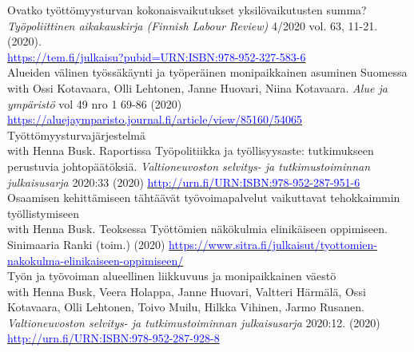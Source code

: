 \documentclass[16pt]{article}
\begin{document}
\noindent Ovatko ty\"{o}tt\"{o}myysturvan kokonaisvaikutukset yksil\"{o}vaikutusten summa? \\
\noindent  \textit{Ty\"{o}poliittinen aikakauskirja (Finnish Labour Review)} 4/2020 vol. 63, 11-21.  (2020). \\ \href{https://tem.fi/julkaisu?pubid=URN:ISBN:978-952-327-583-6} {\textcolor{blue}{https://tem.fi/julkaisu?pubid=URN:ISBN:978-952-327-583-6}}\\

\noindent Alueiden v\"{a}linen ty\"{o}ss\"{a}k\"{a}ynti ja ty\"{o}per\"{a}inen monipaikkainen asuminen Suomessa \\
\noindent with Ossi Kotavaara, Olli Lehtonen, Janne Huovari, Niina Kotavaara. \textit{Alue ja ympäristö} vol 49 nro 1 69-86 (2020) \href{https://aluejaymparisto.journal.fi/article/view/85160/54065}{\textcolor{blue}{https://aluejaymparisto.journal.fi/article/view/85160/54065}} \\
 
\noindent Ty\"{o}tt\"{o}myysturvaj\"{a}rjestelm\"{a} \\
\noindent with Henna Busk. Raportissa Ty\"{o}politiikka ja ty\"{o}llisyysaste: tutkimukseen perustuvia johtop\"{a}\"{a}t\"{o}ksi\"{a}. \textit{Valtioneuvoston selvitys- ja tutkimustoiminnan julkaisusarja} 2020:33 (2020) \href{http://urn.fi/URN:ISBN:978-952-287-951-6}{\textcolor{blue}{http://urn.fi/URN:ISBN:978-952-287-951-6}} \\

\noindent Osaamisen kehitt\"{a}miseen t\"{a}ht\"{a}\"{a}v\"{a}t ty\"{o}voimapalvelut vaikuttavat tehokkaimmin ty\"{o}llistymiseen \\
\noindent with Henna Busk. Teoksessa Työttömien näkökulmia elinikäiseen oppimiseen. Sinimaaria Ranki (toim.) (2020) \href{https://www.sitra.fi/julkaisut/tyottomien-nakokulma-elinikaiseen-oppimiseen/}{\textcolor{blue}{https://www.sitra.fi/julkaisut/tyottomien-nakokulma-elinikaiseen-oppimiseen/}} \\

\noindent Ty\"{o}n ja ty\"{o}voiman alueellinen liikkuvuus ja monipaikkainen v\"{a}est\"{o} \\
\noindent with Henna Busk, Veera Holappa, Janne Huovari, Valtteri H\"{a}rm\"{a}l\"{a}, Ossi Kotavaara, Olli Lehtonen, Toivo Muilu, Hilkka Vihinen, Jarmo Rusanen. \textit{Valtioneuvoston selvitys- ja tutkimustoiminnan julkaisusarja} 2020:12. (2020) \href{http://urn.fi/URN:ISBN:978-952-287-928-8}{\textcolor{blue}{http://urn.fi/URN:ISBN:978-952-287-928-8}} \\
\end{document}
